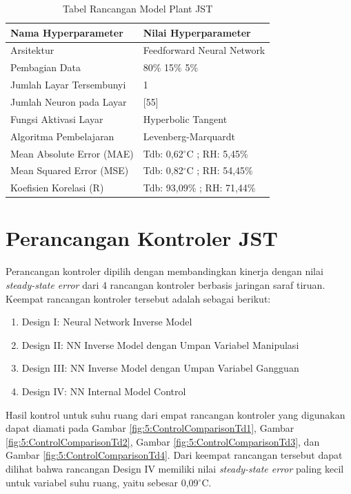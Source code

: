 \begin{table}[!h]
	\caption{Tabel Rancangan Model Plant JST}
	\label{tbl:5:NNPlantRidhan}
	\centering
	\begin{tabular}{|p{5cm}|p{5.2cm}|}
		\hline
		\textbf{Nama Hyperparameter} & \textbf{Nilai Hyperparameter} \\ \hline
		Arsitektur & Feedforward Neural Network \\ \hline
		Pembagian Data & 80\% 15\% 5\% \\ \hline 
		Jumlah Layar Tersembunyi & 1 \\ \hline
		Jumlah Neuron pada Layar & [55] \\ \hline
		Fungsi Aktivasi Layar & Hyperbolic Tangent \\ \hline
		Algoritma Pembelajaran & Levenberg-Marquardt \\ \hline
		Mean Absolute Error (MAE) & Tdb: 0,62$^\circ$C ; RH: 5,45\% \\ \hline
		Mean Squared Error (MSE) & Tdb: 0,82$^\circ$C ; RH: 54,45\% \\ \hline
		Koefisien Korelasi (R) & Tdb: 93,09\% ; RH: 71,44\% \\ \hline
	\end{tabular}
\end{table}

\section{Perancangan Kontroler JST}

Perancangan kontroler dipilih dengan membandingkan kinerja dengan nilai \textit{steady-state error} dari 4 rancangan kontroler berbasis jaringan saraf tiruan. Keempat rancangan kontroler tersebut adalah sebagai berikut:
\begin{enumerate}
	\item Design I: Neural Network Inverse Model
	\item Design II: NN Inverse Model dengan Umpan Variabel Manipulasi
	\item Design III: NN Inverse Model dengan Umpan Variabel Gangguan
	\item Design IV: NN Internal Model Control
\end{enumerate}

Hasil kontrol untuk suhu ruang dari empat rancangan kontroler yang digunakan dapat diamati pada Gambar \ref{fig:5:ControlComparisonTd1}, Gambar \ref{fig:5:ControlComparisonTd2}, Gambar \ref{fig:5:ControlComparisonTd3}, dan Gambar \ref{fig:5:ControlComparisonTd4}. Dari keempat rancangan tersebut dapat dilihat bahwa rancangan Design IV memiliki nilai \textit{steady-state error} paling kecil untuk variabel suhu ruang, yaitu sebesar 0,09$^\circ$C.\\

